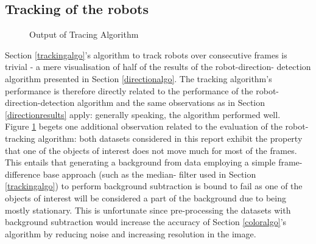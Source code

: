 \documentclass[10pt,a4paper]{article}
\begin{document}
\subsection{Tracking of the robots}\label{trackingresults}
\begin{figure}[ht]
    \begin{center}
    \end{center}
    \caption{Output of Tracing Algorithm}
    \label{trackingfig}
\end{figure}
Section \ref{trackingalgo}'s algorithm to track robots over consecutive frames
is trivial - a mere visualisation of half of the results of the robot-direction-
detection algorithm presented in Section \ref{directionalgo}. The tracking 
algorithm's performance is therefore directly related to the performance of 
the robot-direction-detection algorithm and the same observations as in Section
\ref{directionresults} apply: generally speaking, the algorithm performed 
well.\\
Figure \ref{trackingfig} begets one additional observation related to the
evaluation of the robot-tracking algorithm: both datasets considered in this
report exhibit the property that one of the objects of interest does not move
much for most of the frames. This entails that generating a background from
data employing a simple frame-difference base approach (such as the median-
filter used in Section \ref{trackingalgo}) to perform background subtraction 
is bound to  fail as one of the objects of interest will be considered a part 
of the background due to being mostly stationary. This is unfortunate since
pre-processing the datasets with background subtraction would increase the
accuracy of Section \ref{coloralgo}'s algorithm by reducing noise and increasing
resolution in the image.
\end{document}
